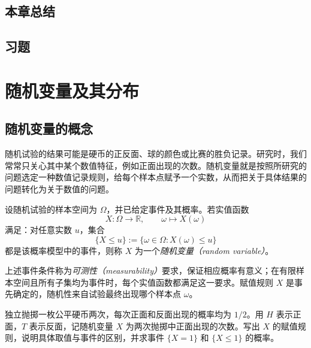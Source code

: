 \documentclass[UTF8,12pt,a4paper,fontset=fandol]{ctexbook}
\begin{document}
\section*{本章总结}

\section*{习题}

\chapter{随机变量及其分布}
\label{chap:study-random-variables}

\section{随机变量的概念}
\label{sec:study-random-variable-concept}

随机试验的结果可能是硬币的正反面、球的颜色或比赛的胜负记录。研究时，我们常常只关心其中某个数值特征，例如正面出现的次数。随机变量就是按照所研究的问题选定一种数值记录规则，给每个样本点赋予一个实数，从而把关于具体结果的问题转化为关于数值的问题。

\begin{definition}
\label{def:study-random-variable}
设随机试验的样本空间为 $\Omega$，并已给定事件及其概率。若实值函数
\[
  X:\Omega\longrightarrow\mathbb R,\qquad
  \omega\longmapsto X(\omega)
\]
满足：对任意实数 $u$，集合
\begin{equation}
  \{X\le u\}:=\{\omega\in\Omega:X(\omega)\le u\}
  \label{eq:study-random-variable-measurability}
\end{equation}
都是该概率模型中的事件，则称 $X$ 为一个\emph{随机变量（random variable）}。
\end{definition}

上述事件条件称为\emph{可测性（measurability）}要求，保证相应概率有意义；在有限样本空间且所有子集均为事件时，每个实值函数都满足这一要求。赋值规则 $X$ 是事先确定的，随机性来自试验最终出现哪个样本点 $\omega$。

\begin{example}
\label{ex:study-random-variable-two-coins}
独立抛掷一枚公平硬币两次，每次正面和反面出现的概率均为 $1/2$。用 $H$ 表示正面，$T$ 表示反面，记随机变量 $X$ 为两次抛掷中正面出现的次数。写出 $X$ 的赋值规则，说明具体取值与事件的区别，并求事件 $\{X=1\}$ 和 $\{X\le1\}$ 的概率。
\end{example}
\end{document}
